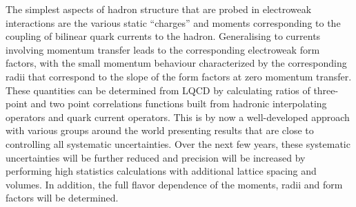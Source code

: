 The simplest aspects of hadron structure that are probed in electroweak interactions are the various static ``charges'' and moments corresponding to the coupling of bilinear quark currents to the hadron. Generalising to currents involving momentum transfer leads to the corresponding electroweak form factors, with the small momentum behaviour characterized by the corresponding radii that correspond to the slope of the form factors at zero momentum transfer. These quantities can be determined from LQCD by calculating ratios of three-point and two point correlations functions built from hadronic interpolating operators and quark current operators. This is by now a well-developed approach with various groups around the world presenting results that are close to controlling all systematic uncertainties. Over the next few years, these systematic uncertainties will be further reduced  and  precision will be increased by performing high statistics calculations with additional lattice spacing and volumes. In addition, the full flavor dependence of the moments, radii and form factors will be determined. 

